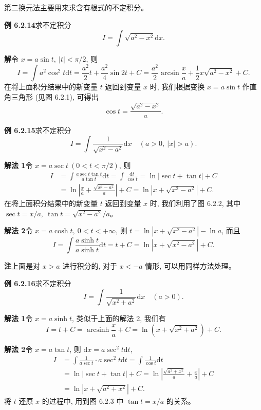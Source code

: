 \documentclass[UTF8, 12pt, fontset=fandol, oneside]{ctexart}
\begin{document}
第二换元法主要用来求含有根式的不定积分。

\noindent\textbf{例 6.2.14}\quad 求不定积分
\[
  I=\int\sqrt{a^2-x^2}\mathrm dx.
\]

\noindent\textbf{解}\quad 令 $x=a\sin t,\ |t|<\pi/2$, 则
\[
  I=\int a^2\cos^2t\mathrm dt
  =
  \frac{a^2}2t+\frac{a^2}4\sin2t+C
  =
  \frac{a^2}2\arcsin\frac xa+\frac12x\sqrt{a^2-x^2}+C.
\]
在将上面积分结果中的新变量 $t$ 返回到变量 $x$ 时, 我们根据变换 $x=a\sin t$ 作直角三角形 (见图 6.2.1), 可得出
\[
  \cos t=\frac{\sqrt{a^2-x^2}}{a}.
\]

\noindent\textbf{例 6.2.15}\quad 求不定积分
\[
  I=\int\frac1{\sqrt{x^2-a^2}}\mathrm dx\quad (a>0,\ |x|>a).
\]

\noindent\textbf{解法 1}\quad 令 $x=a\sec t\ (0<t<\pi/2)$, 则
\[
\begin{aligned}
  I
  &=
  \int\frac{a\sec t\tan t}{a\tan t}\mathrm dt
  =
  \int\frac{\mathrm dt}{\cos t}
  =
  \ln|\sec t+\tan t|+C\\
  &=
  \ln\left|\frac xa+\frac{\sqrt{x^2-a^2}}a\right|+C
  =
  \ln|x+\sqrt{x^2-a^2}|+C.
\end{aligned}
\]
在将上面积分结果中的新变量 $t$ 返回到变量 $x$ 时, 我们利用了图 6.2.2, 其中 $\sec t=x/a,\ \tan t=\sqrt{x^2-a^2}/a$。

\noindent\textbf{解法 2}\quad 令 $x=a\cosh t,\ 0<t<+\infty$, 则 $t=\ln|x+\sqrt{x^2-a^2}|-\ln a$, 而且
\[
  I=\int\frac{a\sinh t}{a\sinh t}\mathrm dt
  =
  t+C
  =
  \ln|x+\sqrt{x^2-a^2}|+C.
\]

\noindent\textbf{注}\quad 上面是对 $x>a$ 进行积分的, 对于 $x<-a$ 情形, 可以用同样方法处理。

\noindent\textbf{例 6.2.16}\quad 求不定积分
\[
  I=\int\frac1{\sqrt{x^2+a^2}}\mathrm dx\quad (a>0).
\]

\noindent\textbf{解法 1}\quad 令 $x=a\sinh t$, 类似于上面的解法 2, 我们有
\[
  I=t+C=\operatorname{arcsinh}\frac xa+C
  =
  \ln(x+\sqrt{x^2+a^2})+C.
\]

\noindent\textbf{解法 2}\quad 令 $x=a\tan t$, 则 $\mathrm dx=a\sec^2t\mathrm dt$,
\[
\begin{aligned}
  I
  &=
  \int\frac1{a\sec t}\cdot a\sec^2t\mathrm dt
  =
  \int\frac1{\cos t}\mathrm dt\\
  &=
  \ln|\sec t+\tan t|+C
  =
  \ln\left|\frac{\sqrt{a^2+x^2}}a+\frac xa\right|+C\\
  &=
  \ln|x+\sqrt{a^2+x^2}|+C.
\end{aligned}
\]
将 $t$ 还原 $x$ 的过程中, 用到图 6.2.3 中 $\tan t=x/a$ 的关系。
\end{document}
